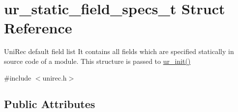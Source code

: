 \hypertarget{structur__static__field__specs__t}{}\section{ur\+\_\+static\+\_\+field\+\_\+specs\+\_\+t Struct Reference}
\label{structur__static__field__specs__t}


Uni\+Rec default field list It contains all fields which are specified statically in source code of a module. This structure is passed to \hyperlink{unirec_8c_a238d68dc4d1dc5b0369e907b0e2d9711}{ur\+\_\+init()}  




{\ttfamily \#include $<$unirec.\+h$>$}

\subsection*{Public Attributes}
